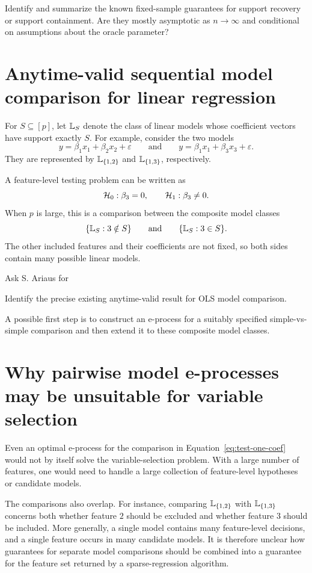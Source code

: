 \documentclass{wyqart}
\newcommand{\yq}[1]{{\color{red} #1}}
\begin{document}
\yq{Identify and summarize the known fixed-sample guarantees for support
recovery or support containment.
Are they mostly asymptotic as $n\to\infty$ and conditional on assumptions
about the oracle parameter?}

\section{Anytime-valid sequential model comparison for linear regression}

For $S\subseteq[p]$, let $\mathbb{L}_S$ denote the class of linear models whose
coefficient vectors have support exactly $S$.
For example, consider the two models
$$
	y=\beta_1x_1+\beta_2x_2+\varepsilon
	\qquad\text{and}\qquad
	y=\beta_1x_1+\beta_3x_3+\varepsilon.
$$
They are represented by $\mathbb{L}_{\{1,2\}}$ and $\mathbb{L}_{\{1,3\}}$,
respectively.

A feature-level testing problem can be written as
\begin{equation}
	\mathcal{H}_0:\beta_3=0,
	\qquad
	\mathcal{H}_1:\beta_3\neq 0.
	\label{eq:test-one-coef}
\end{equation}
When $p$ is large, this is a comparison between the composite model classes
$$
	\{\mathbb{L}_S:3\notin S\}
	\qquad\text{and}\qquad
	\{\mathbb{L}_S:3\in S\}.
$$
The other included features and their coefficients are not fixed,
so both sides contain many possible linear models.

\yq{Ask S. Ariaus for}

\yq{Identify the precise existing anytime-valid result for OLS model
comparison.}

\yq{A possible first step is to construct an e-process for a suitably
specified simple-vs-simple comparison and then extend it to these composite
model classes.}

\section{Why pairwise model e-processes may be unsuitable for variable selection}

Even an optimal e-process for the comparison in
Equation~\eqref{eq:test-one-coef} would not by itself solve the variable-selection
problem.
With a large number of features, one would need to handle a large collection
of feature-level hypotheses or candidate models.

The comparisons also overlap.
For instance, comparing $\mathbb{L}_{\{1,2\}}$ with $\mathbb{L}_{\{1,3\}}$ concerns both
whether feature $2$ should be excluded and whether feature $3$ should be
included.
More generally, a single model contains many feature-level decisions,
and a single feature occurs in many candidate models.
It is therefore unclear how guarantees for separate model comparisons should
be combined into a guarantee for the feature set returned by a
sparse-regression algorithm.
\end{document}
